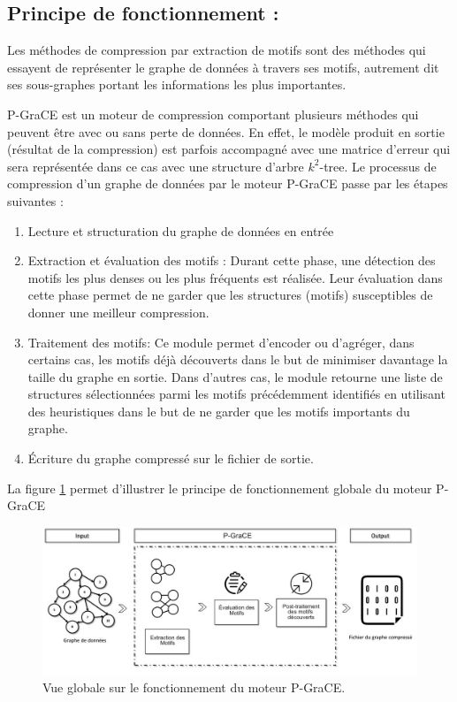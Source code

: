 \documentclass[a4paper,oneside,12pt]{report}
\theoremstyle{definition}
\begin{document}
		\subsection{Principe de fonctionnement :}
		
		Les méthodes de compression par extraction de motifs sont des méthodes qui essayent de représenter le graphe de données à travers ses motifs, autrement dit ses sous-graphes portant les informations les plus importantes. 
		
		P-GraCE est un moteur de compression comportant plusieurs méthodes qui peuvent être avec ou sans perte de données. 
		En effet, le modèle produit en sortie (résultat de la compression) est parfois accompagné avec une matrice d'erreur qui sera représentée dans ce cas avec une structure d'arbre $k^2$-tree. Le processus de compression d'un graphe de données par le moteur P-GraCE passe par les étapes suivantes :
		
\begin{enumerate}

\item Lecture et structuration du graphe de données en entrée 

\item Extraction et évaluation des motifs : Durant cette phase, une détection des motifs les plus denses ou les plus fréquents est réalisée. Leur évaluation dans cette phase permet de ne garder que les structures (motifs) susceptibles de donner une meilleur compression.

\item Traitement des motifs: Ce module permet d'encoder ou d'agréger, dans certains cas, les motifs déjà découverts dans le but de minimiser davantage la taille du graphe en sortie. Dans d'autres cas, le module retourne une liste de structures sélectionnées parmi les motifs précédemment identifiés en utilisant des heuristiques dans le but de ne garder que les motifs importants du graphe. %

\item Écriture du graphe compressé sur le fichier de sortie.
\end{enumerate}

La figure \ref{P_grace} permet d'illustrer le principe de fonctionnement globale du moteur \gls{P-GraCE}


\begin{figure}[H]
	\includegraphics[scale=0.48]{./ressources/image/pgrace.jpg}
	\caption[Vue globale sur le fonctionnement du moteur \gls{P-GraCE}.]{Vue globale sur le fonctionnement du moteur P-GraCE.}
	\label{P_grace}
\end{figure}
\end{document}
